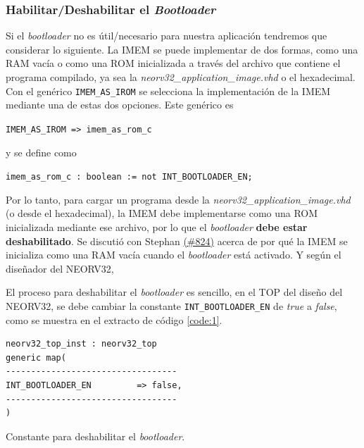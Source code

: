 \subsubsection{Habilitar/Deshabilitar el \textit{Bootloader}}

Si el \textit{bootloader} no es útil/necesario para nuestra aplicación tendremos que considerar lo siguiente.
La IMEM se puede implementar de dos formas, como una RAM vacía o como una ROM inicializada a través del archivo que contiene el programa compilado, ya sea la \textit{neorv32\_application\_image.vhd} o el hexadecimal. 
Con el genérico \texttt{IMEM_AS_IROM} se selecciona la implementación de la IMEM mediante una de estas dos opciones. 
Este genérico es
 
\hspace{35mm} \texttt{IMEM_AS_IROM => imem_as_rom_c} 

\noindent y se define como 

\hspace{17mm} \texttt{imem_as_rom_c : boolean := not INT_BOOTLOADER_EN;}

\noindent Por lo tanto, para cargar un programa desde la \textit{neorv32\_application\_image.vhd} (o desde el hexadecimal), la IMEM debe implementarse como una ROM inicializada mediante ese archivo, por lo que el \textit{bootloader} \textbf{debe estar deshabilitado}.
Se discutió con Stephan \href{https://github.com/stnolting/neorv32/discussions/824}{(\#824)} acerca de por qué la IMEM se inicializa como una RAM vacía cuando el \textit{bootloader} está activado. 
Y según el diseñador del NEORV32, 

El proceso para deshabilitar el \textit{bootloader} es sencillo, en el TOP del diseño del NEORV32, se debe cambiar la constante \texttt{INT_BOOTLOADER_EN} de \textit{true} a \textit{false}, como se muestra en el extracto de código \ref{code:1}.

\begin{code}
\begin{verbatim}
neorv32_top_inst : neorv32_top
generic map(
----------------------------------
INT_BOOTLOADER_EN         => false,
----------------------------------
)
\end{verbatim}
\caption{Constante para deshabilitar el \textit{bootloader}.}
\label{code:1}
\end{code}

